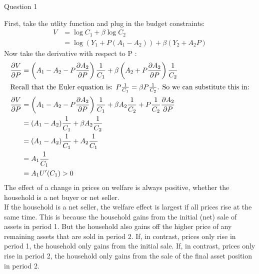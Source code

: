 \documentclass[a4paper]{article}
\begin{document}
\begin{questionbox}{Question 1}
\begin{enumerate}[(a)]
			\begin{explanationbox}
				First, take the utlity function and plug in the budget constraints:
				\begin{align*}
					V &= \log C_1 + \beta\log C_2\\
					&= \log (Y_1 + P(A_1 - A_2)) + \beta(Y_2 + A_2 P)
				\end{align*}
				Now take the derivative with respect to P :
				\begin{align*}
					\frac{\partial V}{\partial P} &= \left( A_1-A_2-P\frac{\partial A_2}{\partial P} \right) \frac{1}{C_1} + \beta\left( A_2 + P \frac{\partial A_2}{\partial P} \right) \frac{1}{C_2}\\
				\intertext{Recall that the Euler equation is: \( P\frac{1}{C_1} = \beta P \frac{1}{C_2} \). So we can substitute this in:}
					\frac{\partial V}{\partial P} &=\left( A_1-A_2-P\frac{\partial A_2}{\partial P} \right) \frac{1}{C_1} + \beta A_2 \frac{1}{C_2} + P \frac{1}{C_2}\frac{\partial A_2}{\partial P}\\
					&= (A_1 - A_2)\frac{1}{C_1} + \beta A_2 \frac{1}{C_2}\\
					&= (A_1 - A_2)\frac{1}{C_1} + A_2 \frac{1}{C_1}\\
					&= A_1 \frac{1}{C_1}\\
					&= A_1 U'(C_1) > 0
				\end{align*}
				The effect of a change in prices on welfare is always positive, whether the household is a net buyer or net seller.\\
				If the household is a net seller, the welfare eﬀect is largest if all prices rise at the same time. This is because the household gains from the initial (net) sale of assets in period 1. But the household also gains oﬀ the higher price of any remaining assets that are sold in period 2. If, in contrast, prices only rise in period 1, the household only gains from the initial sale. If, in contrast, prices only rise in period 2, the household only gains from the sale of the ﬁnal asset position in period 2.
			\end{explanationbox}
		\end{enumerate}
	\end{questionbox}
\end{document}
